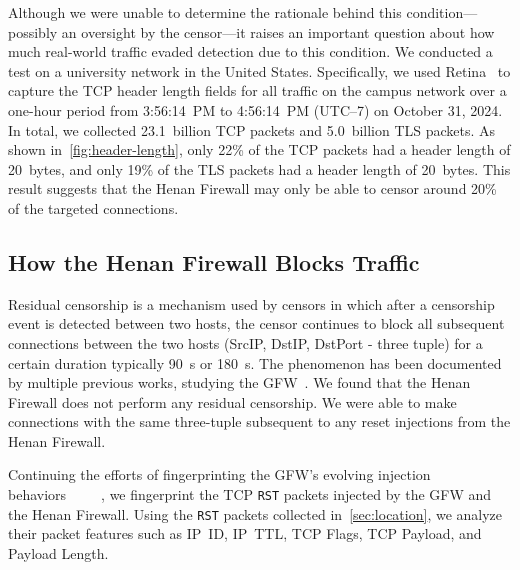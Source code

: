 \documentclass[conference,compsoc]{IEEEtran}
\begin{document}
Although we were unable to determine
the rationale behind this condition---possibly an oversight by the censor---it raises an important question about how
much real-world traffic evaded detection due to this condition.
We conducted a test on a university network in the United States.
Specifically,
we used Retina~\cite{wan2022retina} to capture
the TCP header length fields for all traffic on the campus network
over a one-hour period
from 3:56:14~PM to 4:56:14~PM (UTC–7) on October 31, 2024.
In total, we collected 23.1~billion TCP
packets and 5.0~billion TLS packets.
As shown in~\autoref{fig:header-length},
only 22\% of the TCP packets had a header length of 20~bytes, and only 19\% of
the TLS packets had a header length of 20~bytes.
This result suggests that
the Henan Firewall may only be able to censor around 20\% of the targeted connections.


\subsection{How the Henan Firewall Blocks Traffic}
\label{sec:how-block}

Residual censorship is a mechanism used by censors in which after a censorship event is detected between two hosts,
the censor continues to block all subsequent connections between the two hosts (SrcIP, DstIP, DstPort - three tuple)
for a certain duration typically 90~s or 180~s.
The phenomenon has been documented by multiple previous works,
studying the GFW~\cite{Bock2021a, Clayton2006a, Rambert2021a}.
We found that the Henan Firewall does not perform any residual censorship.
We were able to make connections with the same three-tuple subsequent to any reset injections from the Henan Firewall.


Continuing the efforts of fingerprinting the GFW's evolving injection behaviors~\cite{klzgrad2009gfw}~\cite{gfwrev2010http}~\cite[\S 3.1]{Niere2023a}~\cite[\S 7.1.6]{Weaver2009a}~\cite[\S 2.1]{Wang2017a},
we fingerprint the TCP \texttt{RST} packets injected by the GFW and the Henan Firewall.
Using the \texttt{RST} packets collected in~\autoref{sec:location},
we analyze their packet features such as IP~ID, IP~TTL, TCP Flags, TCP Payload, and Payload Length.
\end{document}
